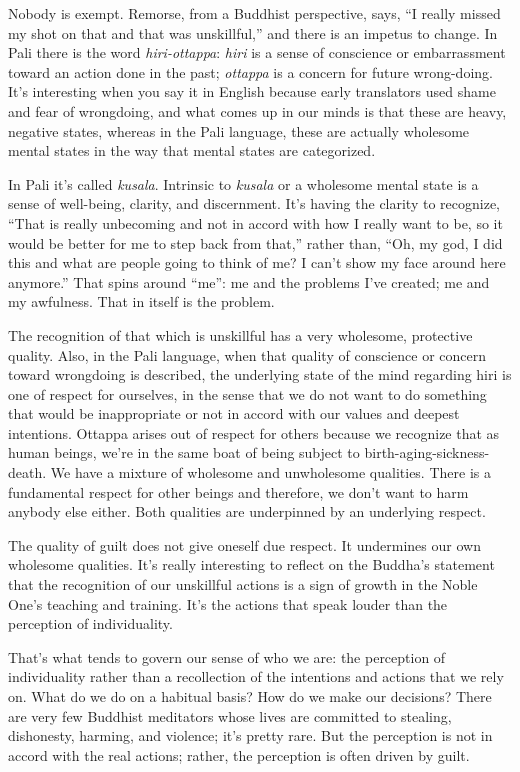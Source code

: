 Nobody is exempt. Remorse, from a Buddhist perspective, says, “I really
missed my shot on that and that was unskillful,” and there is an impetus
to change. In Pali there is the word \emph{hiri-ottappa}: \emph{hiri} is
a sense of conscience or embarrassment toward an action done in the
past; \emph{ottappa} is a concern for future wrong-doing. It’s
interesting when you say it in English because early translators used
shame and fear of wrongdoing, and what comes up in our minds is that
these are heavy, negative states, whereas in the Pali language, these
are actually wholesome mental states in the way that mental states are
categorized.

In Pali it’s called \emph{kusala}. Intrinsic to \emph{kusala} or a
wholesome mental state is a sense of well-being, clarity, and
discernment. It’s having the clarity to recognize, “That is really
unbecoming and not in accord with how I really want to be, so it would
be better for me to step back from that,” rather than, “Oh, my god, I
did this and what are people going to think of me? I can’t show my face
around here anymore.” That spins around “me”: me and the problems I’ve
created; me and my awfulness. That in itself is the problem.

The recognition of that which is unskillful has a very wholesome,
protective quality. Also, in the Pali language, when that quality of
conscience or concern toward wrongdoing is described, the underlying
state of the mind regarding hiri is one of respect for ourselves, in the
sense that we do not want to do something that would be inappropriate or
not in accord with our values and deepest intentions. Ottappa arises out
of respect for others because we recognize that as human beings, we’re
in the same boat of being subject to birth-aging-sickness-death. We have
a mixture of wholesome and unwholesome qualities. There is a fundamental
respect for other beings and therefore, we don’t want to harm anybody
else either. Both qualities are underpinned by an underlying respect.

The quality of guilt does not give oneself due respect. It undermines
our own wholesome qualities. It’s really interesting to reflect on the
Buddha’s statement that the recognition of our unskillful actions is a
sign of growth in the Noble One’s teaching and training. It’s the
actions that speak louder than the perception of individuality.

That’s what tends to govern our sense of who we are: the perception of
individuality rather than a recollection of the intentions and actions
that we rely on. What do we do on a habitual basis? How do we make our
decisions? There are very few Buddhist meditators whose lives are
committed to stealing, dishonesty, harming, and violence; it’s pretty
rare. But the perception is not in accord with the real actions; rather,
the perception is often driven by guilt.

